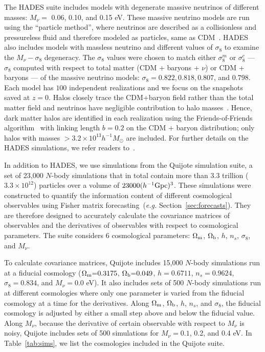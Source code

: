 \documentclass[12pt, letterpaper, preprint]{aastex62}
\newcommand{\Om}{\Omega_{\rm m}}
\newcommand{\Ob}{\Omega_{\rm b}}
\newcommand{\smnu}{M_\nu}
\newcommand{\sig}{\sigma_8}
\begin{document}
The HADES suite includes models with degenerate massive neutrinos of different 
masses: $\smnu = $ 0.06, 0.10, and 0.15 eV. These massive neutrino models are run 
using the ``particle method'', where neutrinos are described as a collisionless 
and pressureless fluid and therefore modeled as particles, same as 
CDM~\citep{brandbyge2008,viel2010}. HADES also includes models with massless 
neutrino and different values of $\sigma_8$ to examine the $\smnu-\sigma_8$ 
degeneracy. The $\sigma_8$ values were chosen to match either $\sigma_8^m$ or 
$\sigma_8^{c}$ --- $\sigma_8$ computed with respect to total matter 
(CDM + baryons + $\nu$) or CDM + baryons --- of the massive neutrino models: 
$\sigma_8 = 0.822, 0.818, 0.807$, and $0.798$. Each model has $100$ independent 
realizations and we focus on the snapshots saved at $z = 0$. Halos closely 
trace the CDM+baryon field rather than the total matter field and neutrinos 
have negligible contribution to halo masses~\citep[\emph{e.g.}][]{ichiki2012, castorina2014, loverde2014, villaescusa-navarro2014}.
Hence, dark matter halos are identified in each realization using the Friends-of-Friends 
algorithm~\cite[FoF;][]{davis1985} with linking length $b=0.2$ on the CDM + baryon
distribution; only halos with masses $> 3.2\times 10^{13} h^{-1}M_\odot$ 
are included. For further details on the HADES simulations, we refer readers 
to~\cite{villaescusa-navarro2018}. 

In addition to HADES, we use simulations from the Quijote simulation suite, a
set of 23,000 $N$-body simulations that in total contain more than 3.3 trillion 
($3.3\times10^{12}$) particles over a volume of $23000 (h^{-1}{\rm Gpc})^3$. 
These simulations were constructed to quantify the information content of 
different cosmological observables using Fisher matrix forecasting~(\emph{e.g.} 
Section~\ref{sec:forecasts}). They are therefore designed to accurately calculate 
the covariance matrices of observables and the derivatives of observables with 
respect to cosmological parameters. The suite considers 6 cosmological parameters: 
$\Om$, $\Ob$, $h$, $n_s$, $\sig$, and $\smnu$.

To calculate covariance matrices, Quijote includes 15,000 $N$-body simulations 
run at a fiducial cosmology ($\Om{=}0.3175$, $\Ob{=}0.049$, $h{=}0.6711$, 
$n_s{=}0.9624$, $\sig{=}0.834$, and $\smnu{=}0.0$ eV). It also includes sets 
of 500 $N$-body simulations run at different cosmologies where only one parameter 
is varied from the fiducial cosmology at a time for the derivatives. Along $\Om$, 
$\Ob$, $h$, $n_s$, and $\sig$, the fiducial cosmology is adjusted by either a 
small step above and below the fiducial value. Along $\smnu$, because the 
derivative of certain observable with respect to $\smnu$ is noisy, Quijote 
includes sets of 500 simulations for $\smnu = 0.1$, 0.2, and 0.4 eV. In 
Table~\ref{tab:sims}, we list the cosmologies included in the Quijote suite. 
\end{document}
